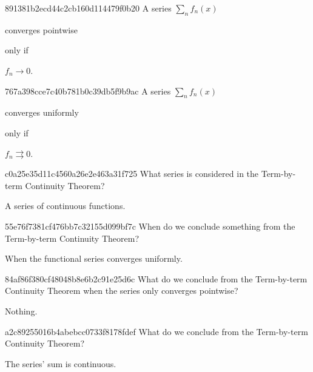 \begin{note}{891381b2ecd44c2cb160d114479f0b20}
    A series \({ \sum_n f_n(x) }\) \begin{icloze}{2}converges pointwise\end{icloze} \begin{icloze}{3}only if\end{icloze} \begin{icloze}{1}\({ f_n \to 0 }\).\end{icloze}
\end{note}

\begin{note}{767a398cce7c40b781b0c39db5f9b9ac}
    A series \({ \sum_n f_n(x) }\) \begin{icloze}{2}converges uniformly\end{icloze} \begin{icloze}{3}only if\end{icloze} \begin{icloze}{1}\({ f_n \rightrightarrows 0 }\).\end{icloze}
\end{note}

\begin{note}{c0a25e35d11c4560a26e2e463a31f725}
    What series is considered in the Term-by-term Continuity Theorem?

    \begin{cloze}{1}
        A series of continuous functions.
    \end{cloze}
\end{note}

\begin{note}{55e76f7381cf476bb7c32155d099bf7c}
    When do we conclude something from the Term-by-term Continuity Theorem?

    \begin{cloze}{1}
        When the functional series converges uniformly.
    \end{cloze}
\end{note}

\begin{note}{84af86f380cf48048b8e6b2c91e25d6c}
    What do we conclude from the Term-by-term Continuity Theorem when the series only converges pointwise?

    \begin{cloze}{1}
        Nothing.
    \end{cloze}
\end{note}

\begin{note}{a2c89255016b4abebcc0733f8178fdef}
    What do we conclude from the Term-by-term Continuity Theorem?

    \begin{cloze}{1}
        The series' sum is continuous.
    \end{cloze}
\end{note}

